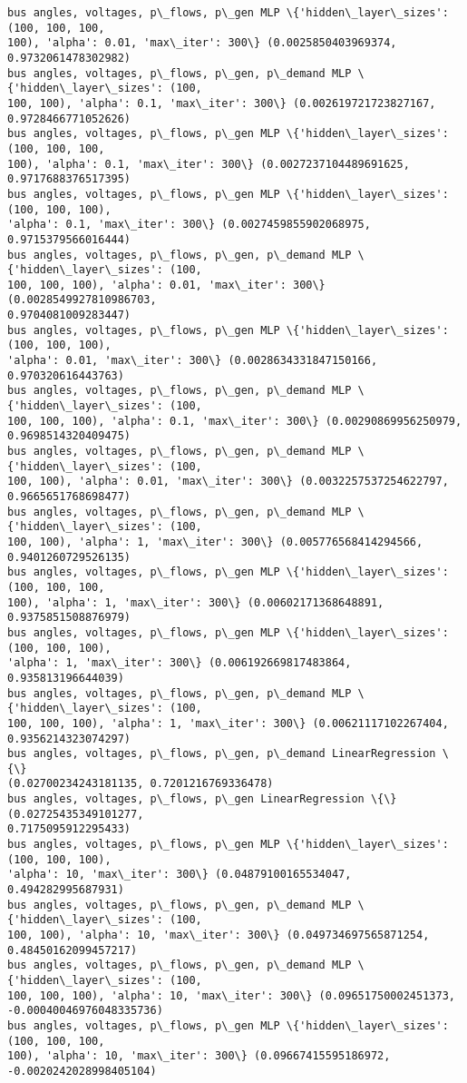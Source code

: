 \documentclass[11pt]{article}
\begin{document}
    \begin{Verbatim}[commandchars=\\\{\}]
bus angles, voltages, p\_flows, p\_gen MLP \{'hidden\_layer\_sizes': (100, 100, 100,
100), 'alpha': 0.01, 'max\_iter': 300\} (0.0025850403969374, 0.9732061478302982)
bus angles, voltages, p\_flows, p\_gen, p\_demand MLP \{'hidden\_layer\_sizes': (100,
100, 100), 'alpha': 0.1, 'max\_iter': 300\} (0.002619721723827167,
0.9728466771052626)
bus angles, voltages, p\_flows, p\_gen MLP \{'hidden\_layer\_sizes': (100, 100, 100,
100), 'alpha': 0.1, 'max\_iter': 300\} (0.0027237104489691625, 0.9717688376517395)
bus angles, voltages, p\_flows, p\_gen MLP \{'hidden\_layer\_sizes': (100, 100, 100),
'alpha': 0.1, 'max\_iter': 300\} (0.0027459855902068975, 0.9715379566016444)
bus angles, voltages, p\_flows, p\_gen, p\_demand MLP \{'hidden\_layer\_sizes': (100,
100, 100, 100), 'alpha': 0.01, 'max\_iter': 300\} (0.0028549927810986703,
0.9704081009283447)
bus angles, voltages, p\_flows, p\_gen MLP \{'hidden\_layer\_sizes': (100, 100, 100),
'alpha': 0.01, 'max\_iter': 300\} (0.0028634331847150166, 0.970320616443763)
bus angles, voltages, p\_flows, p\_gen, p\_demand MLP \{'hidden\_layer\_sizes': (100,
100, 100, 100), 'alpha': 0.1, 'max\_iter': 300\} (0.00290869956250979,
0.9698514320409475)
bus angles, voltages, p\_flows, p\_gen, p\_demand MLP \{'hidden\_layer\_sizes': (100,
100, 100), 'alpha': 0.01, 'max\_iter': 300\} (0.0032257537254622797,
0.9665651768698477)
bus angles, voltages, p\_flows, p\_gen, p\_demand MLP \{'hidden\_layer\_sizes': (100,
100, 100), 'alpha': 1, 'max\_iter': 300\} (0.005776568414294566,
0.9401260729526135)
bus angles, voltages, p\_flows, p\_gen MLP \{'hidden\_layer\_sizes': (100, 100, 100,
100), 'alpha': 1, 'max\_iter': 300\} (0.00602171368648891, 0.9375851508876979)
bus angles, voltages, p\_flows, p\_gen MLP \{'hidden\_layer\_sizes': (100, 100, 100),
'alpha': 1, 'max\_iter': 300\} (0.006192669817483864, 0.935813196644039)
bus angles, voltages, p\_flows, p\_gen, p\_demand MLP \{'hidden\_layer\_sizes': (100,
100, 100, 100), 'alpha': 1, 'max\_iter': 300\} (0.00621117102267404,
0.9356214323074297)
bus angles, voltages, p\_flows, p\_gen, p\_demand LinearRegression \{\}
(0.02700234243181135, 0.7201216769336478)
bus angles, voltages, p\_flows, p\_gen LinearRegression \{\} (0.02725435349101277,
0.7175095912295433)
bus angles, voltages, p\_flows, p\_gen MLP \{'hidden\_layer\_sizes': (100, 100, 100),
'alpha': 10, 'max\_iter': 300\} (0.04879100165534047, 0.494282995687931)
bus angles, voltages, p\_flows, p\_gen, p\_demand MLP \{'hidden\_layer\_sizes': (100,
100, 100), 'alpha': 10, 'max\_iter': 300\} (0.049734697565871254,
0.48450162099457217)
bus angles, voltages, p\_flows, p\_gen, p\_demand MLP \{'hidden\_layer\_sizes': (100,
100, 100, 100), 'alpha': 10, 'max\_iter': 300\} (0.09651750002451373,
-0.00040046976048335736)
bus angles, voltages, p\_flows, p\_gen MLP \{'hidden\_layer\_sizes': (100, 100, 100,
100), 'alpha': 10, 'max\_iter': 300\} (0.09667415595186972,
-0.0020242028998405104)
    \end{Verbatim}
\end{document}

